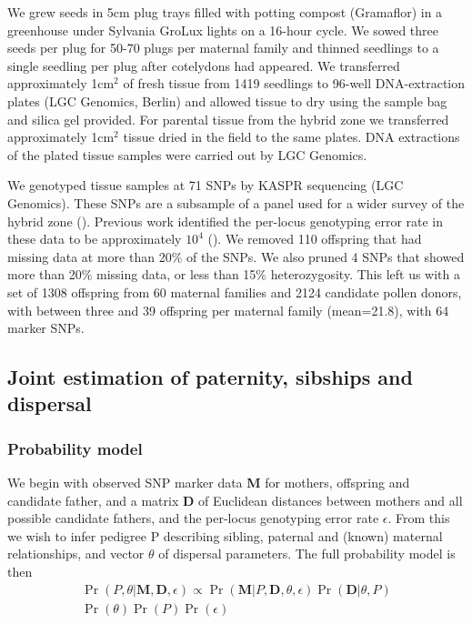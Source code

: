 \documentclass[10pt, a4paper, twocolumn]{article} %
\begin{document}
We grew seeds in 5cm plug trays filled with potting compost (Gramaflor) in a greenhouse under Sylvania GroLux lights on a 16-hour cycle. We sowed three seeds per plug for 50-70 plugs per maternal family and thinned seedlings to a single seedling per plug after cotelydons had appeared. We transferred approximately 1cm$^2$ of fresh tissue from 1419 seedlings to 96-well DNA-extraction plates (LGC Genomics, Berlin) and allowed tissue to dry using the sample bag and silica gel provided. For parental tissue from the hybrid zone we transferred approximately 1cm$^2$ tissue dried in the field to the same plates. DNA extractions of the plated tissue samples were carried out by LGC Genomics.

We genotyped tissue samples at 71 SNPs by KASPR sequencing (LGC Genomics).
These SNPs are a subsample of a panel used for a wider survey of the hybrid zone (\cite{surendranadh2022effects}).
Previous work identified the per-locus genotyping error rate in these data to be approximately $10^4$ (\cite{surendranadh2022effects}).
We removed 110 offspring that had missing data at more than 20\% of the SNPs.
We also pruned 4 SNPs that showed more than 20\% missing data, or less than 15\% heterozygosity.
This left us with a set of 1308 offspring from 60 maternal families and 2124 candidate pollen donors, with between three and 39 offspring per maternal family (mean=21.8), with 64 marker SNPs.

\subsection{Joint estimation of paternity, sibships and dispersal}

\subsubsection{Probability model}

We begin with observed SNP marker data \textbf{M} for mothers, offspring and candidate father, and a matrix \textbf{D} of Euclidean distances between mothers and all possible candidate fathers, and the per-locus genotyping error rate $\epsilon$. From this we wish to infer pedigree P describing sibling, paternal and (known) maternal relationships, and vector $\theta$ of dispersal parameters. The full probability model is then
\begin{equation}
\label{eqn:probability_model}
\begin{split}
\Pr( P, \theta | \textbf{M}, \textbf{D}, \epsilon) \propto \Pr(\textbf{M} | P, \textbf{D}, \theta, \epsilon)
\Pr(\textbf{D} | \theta, P) \\
\Pr(\theta) \Pr(P) \Pr(\epsilon)
\end{split}
\end{equation}
\end{document}
